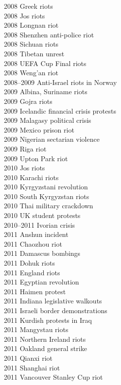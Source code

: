 2008 Greek riots\\
2008 Jos riots\\
2008 Longnan riot\\
2008 Shenzhen anti-police riot\\
2008 Sichuan riots\\
2008 Tibetan unrest\\
2008 UEFA Cup Final riots\\
2008 Weng'an riot\\
2008–2009 Anti-Israel riots in Norway\\
2009 Albina, Suriname riots\\
2009 Gojra riots\\
2009 Icelandic financial crisis protests\\
2009 Malagasy political crisis\\
2009 Mexico prison riot\\
2009 Nigerian sectarian violence\\
2009 Riga riot\\
2009 Upton Park riot\\
2010 Jos riots\\
2010 Karachi riots\\
2010 Kyrgyzstani revolution\\
2010 South Kyrgyzstan riots\\
2010 Thai military crackdown\\
2010 UK student protests\\
2010–2011 Ivorian crisis\\
2011 Anshun incident\\
2011 Chaozhou riot\\
2011 Damascus bombings\\
2011 Dohuk riots\\
2011 England riots\\
2011 Egyptian revolution\\
2011 Haimen protest\\
2011 Indiana legislative walkouts\\
2011 Israeli border demonstrations\\
2011 Kurdish protests in Iraq\\
2011 Mangystau riots\\
2011 Northern Ireland riots\\
2011 Oakland general strike\\
2011 Qianxi riot\\
2011 Shanghai riot\\
2011 Vancouver Stanley Cup riot\\
